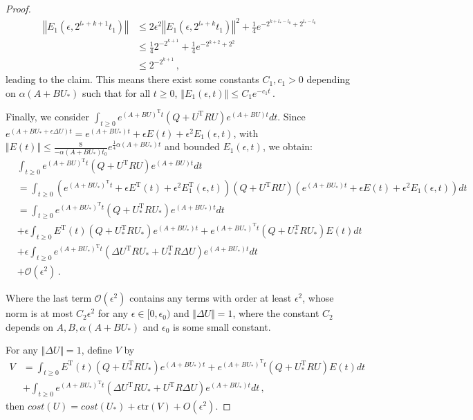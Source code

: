 \documentclass{article}
\theoremstyle{definition}
\begin{document}
\begin{proof}
\begin{align*}
\left\Vert E_{1}(\epsilon,2^{l_{*}+k+1}t_{1})\right\Vert&\leq 2\epsilon^{2}\left\Vert E_{1}(\epsilon,2^{l_{*}+k}t_{1})\right\Vert^{2}+\frac{1}{4}e^{-2^{k+l_{*}-l_{0}}+2^{l_{*}-l_{0}}}\\
&\leq \frac{1}{4}2^{-2^{k+1}}+\frac{1}{4}e^{-2^{k+2}+2^{2}}\\
&\leq 2^{-2^{k+1}}\,,
\end{align*}
leading to the claim. This means there exist some constants $C_{1},c_{1}>0$ depending on $\alpha(A+BU_{*})$ such that for all $t\geq 0$,
$\left\Vert E_{1}(\epsilon,t)\right\Vert\leq C_{1}e^{-c_{1}t}$\,.



Finally, we consider $\int_{t\geq 0}e^{(A+BU)^{\mathrm{T}}t}(Q+U^{\mathrm{T}}RU)e^{(A+BU)t}dt $. Since \\$e^{(A+BU_{*}+\epsilon \Delta U)t}=e^{(A+BU_{*})t}+\epsilon E(t)+\epsilon^{2}E_{1}(\epsilon,t)$, with $\Vert E(t)\Vert \leq \frac{8}{-\alpha(A+BU_{*})t_{0}}e^{\frac{1}{4}\alpha(A+BU_{*})t}$ and bounded $E_{1}(\epsilon,t)$, we obtain:
\begin{align*}
&\int_{t\geq 0}e^{(A+BU)^{\mathrm{T}}t}(Q+U^{\mathrm{T}}RU)e^{(A+BU)t}dt\\
&=\int_{t\geq 0}(e^{(A+BU_{*})^{\mathrm{T}}t}+\epsilon E^{\mathrm{T}}(t)+\epsilon^{2}E_{1}^{\mathrm{T}}(\epsilon,t))(Q+U^{\mathrm{T}}RU)(e^{(A+BU_{*})t}+\epsilon E(t)+\epsilon^{2}E_{1}(\epsilon,t))dt\\
&=\int_{t\geq 0}e^{(A+BU_{*})^{\mathrm{T}}t}(Q+U_{*}^{\mathrm{T}}RU_{*})e^{(A+BU_{*})t}dt\\
&+\epsilon \int_{t\geq 0} E^{\mathrm{T}}(t)(Q+U_{*}^{\mathrm{T}}RU_{*})e^{(A+BU_{*})t}+e^{(A+BU_{*})^{\mathrm{T}}t}(Q+U_{*}^{\mathrm{T}}RU_{*})E(t)dt\\
&+\epsilon \int_{t\geq 0}e^{(A+BU_{*})^{\mathrm{T}}t}\left(\Delta U^{\mathrm{T}}RU_{*}+U^{\mathrm{T}}_{*}R\Delta U\right)e^{(A+BU_{*})t}dt\\
&+\mathcal{O}(\epsilon^{2})\,.
\end{align*}

Where the last term $\mathcal{O}(\epsilon^{2})$ contains any terms with order at least $\epsilon^{2}$, whose norm is at most $C_{2}\epsilon^{2}$ for any $\epsilon\in[0,\epsilon_{0})$ and $\Vert \Delta U\Vert =1$, where the constant $C_{2}$ depends on $A,B,\alpha(A+BU_{*})$ and $\epsilon_{0}$ is some small constant.

For any $\Vert \Delta U\Vert =1$, define $V$ by
\begin{align*}
V&=\int_{t\geq 0} E^{\mathrm{T}}(t)(Q+U_{*}^{\mathrm{T}}RU_{*})e^{(A+BU_{*})t}+e^{(A+BU_{*})^{\mathrm{T}}t}(Q+U_{*}^{\mathrm{T}}RU)E(t)dt\\&+\int_{t\geq 0}e^{(A+BU_{*})^{\mathrm{T}}t}\left(\Delta U^{\mathrm{T}}RU_{*}+U^{\mathrm{T}}R\Delta U\right)e^{(A+BU_{*})t}dt\,,
\end{align*}
then $cost(U)=cost(U_{*})+\epsilon \mathrm{tr}(V)+O(\epsilon^{2})$. 


\end{proof}
\end{document}
